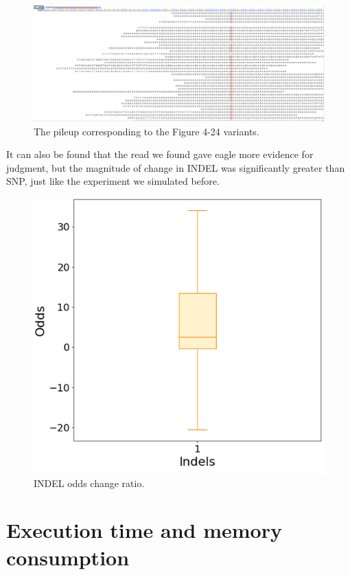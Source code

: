 \vspace{0.5cm}
\begin{figure}[H]
    \centering
    \includegraphics[width=1\columnwidth]{body/image/4-25.png}
    \captionsetup{labelfont=bf}
    \renewcommand{\baselinestretch}{1.0}
    \vspace{-1cm}
    \caption[Figure 4.24 pileup]{The pileup corresponding to the Figure 4-24 variants.}
    \label{f4-25}
\end{figure}

It can also be found that the read we found gave eagle more evidence for judgment, but the magnitude of change in INDEL was significantly greater than SNP, just like the experiment we simulated before.

\begin{figure}[H]
    \centering
    \includegraphics[width=0.6\columnwidth]{body/image/4-26.png}
    \captionsetup{labelfont=bf}
    \renewcommand{\baselinestretch}{1.0}
    \caption[INDEL odds change ratio]{INDEL odds change ratio.}
    \label{f4-26}
\end{figure}

\section{Execution time and memory consumption}

